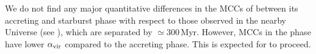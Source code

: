 \IfFileExists{emulateapjlegacy.cls}{\documentclass[iop]{emulateapjlegacy}}{\documentclass[iop]{emulateapj}}
\newcommand{\MM}[1]{({\bf \color{mmcolor} MM: #1})}
\begin{document}
We do not find any major quantitative differences in the MCCs of \flower between its accreting and starburst phase with respect to those observed in the nearby Universe (see ), which are separated by $\simeq$300\,Myr. However, MCCs in the \SB phase have lower $\alpha_{\rm vir}$ compared to the accreting phase. This is expected for \SF to proceed.

%
%
\end{document}
